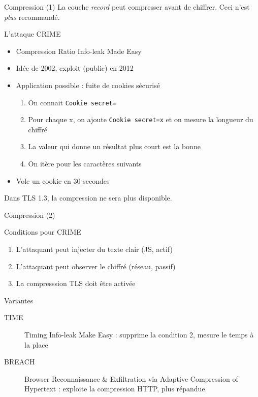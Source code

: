 \documentclass{mpg-ep-slides}
\begin{document}
\begin{frame}{Compression (1)}
  La couche \emph{record} peut compresser avant de chiffrer. Ceci n'est
  \emph{plus} recommandé.

  \begin{block}{L'attaque CRIME}
    \begin{itemize}
      \item Compression Ratio Info-leak Made Easy
      \item Idée de 2002, exploit (public) en 2012
      \item Application possible : fuite de cookies sécurisé
        \begin{enumerate}
          \item On connait \texttt{Cookie secret=}
          \item Pour chaque x, on ajoute \texttt{Cookie secret=x} et on mesure
            la longueur du chiffré
          \item La valeur qui donne un résultat plus court est la bonne
          \item On itère pour les caractères suivants
        \end{enumerate}
      \item Vole un cookie en 30 secondes
    \end{itemize}
  \end{block}

  Dans TLS 1.3, la compression ne sera plus disponible.
\end{frame}

\begin{frame}{Compression (2)}
  \begin{block}{Conditions pour CRIME}
    \begin{enumerate}
      \item L'attaquant peut injecter du texte clair (JS, actif)
      \item L'attaquant peut observer le chiffré (réseau, passif)
      \item La compresssion TLS doit être activée
    \end{enumerate}
  \end{block}

  \begin{block}{Variantes}
    \begin{description}
      \item[TIME] Timing Info-leak Make Easy : supprime la condition 2, mesure
        le temps à la place
      \item[BREACH] Browser Reconnaissance \& Exfiltration via Adaptive
        Compression of Hypertext : exploite la compression HTTP, plus
        répandue.
    \end{description}
  \end{block}
\end{frame}
\end{document}
